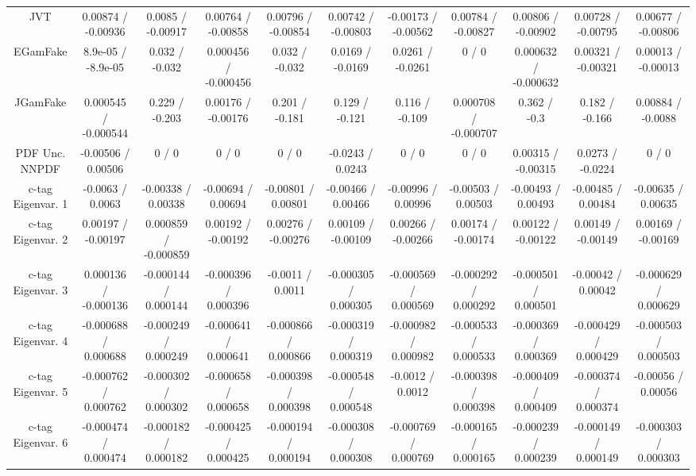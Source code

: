 \begin{table}[htbp]
\begin{center}
\begin{tabular}{|c|c|c|c|c|c|c|c|c|c|c|}
  JVT & 0.00874 / -0.00936 & 0.0085 / -0.00917 & 0.00764 / -0.00858 & 0.00796 / -0.00854 & 0.00742 / -0.00803 & -0.00173 / -0.00562 & 0.00784 / -0.00827 & 0.00806 / -0.00902 & 0.00728 / -0.00795 & 0.00677 / -0.00806 \\ 
  EGamFake & 8.9e-05 / -8.9e-05 & 0.032 / -0.032 & 0.000456 / -0.000456 & 0.032 / -0.032 & 0.0169 / -0.0169 & 0.0261 / -0.0261 & 0 / 0 & 0.000632 / -0.000632 & 0.00321 / -0.00321 & 0.00013 / -0.00013 \\ 
  JGamFake & 0.000545 / -0.000544 & 0.229 / -0.203 & 0.00176 / -0.00176 & 0.201 / -0.181 & 0.129 / -0.121 & 0.116 / -0.109 & 0.000708 / -0.000707 & 0.362 / -0.3 & 0.182 / -0.166 & 0.00884 / -0.0088 \\ 
  PDF Unc. NNPDF & -0.00506 / 0.00506 & 0 / 0 & 0 / 0 & 0 / 0 & -0.0243 / 0.0243 & 0 / 0 & 0 / 0 & 0.00315 / -0.00315 & 0.0273 / -0.0224 & 0 / 0 \\ 
  c-tag Eigenvar. 1 & -0.0063 / 0.0063 & -0.00338 / 0.00338 & -0.00694 / 0.00694 & -0.00801 / 0.00801 & -0.00466 / 0.00466 & -0.00996 / 0.00996 & -0.00503 / 0.00503 & -0.00493 / 0.00493 & -0.00485 / 0.00484 & -0.00635 / 0.00635 \\ 
  c-tag Eigenvar. 2 & 0.00197 / -0.00197 & 0.000859 / -0.000859 & 0.00192 / -0.00192 & 0.00276 / -0.00276 & 0.00109 / -0.00109 & 0.00266 / -0.00266 & 0.00174 / -0.00174 & 0.00122 / -0.00122 & 0.00149 / -0.00149 & 0.00169 / -0.00169 \\ 
  c-tag Eigenvar. 3 & 0.000136 / -0.000136 & -0.000144 / 0.000144 & -0.000396 / 0.000396 & -0.0011 / 0.0011 & -0.000305 / 0.000305 & -0.000569 / 0.000569 & -0.000292 / 0.000292 & -0.000501 / 0.000501 & -0.00042 / 0.00042 & -0.000629 / 0.000629 \\ 
  c-tag Eigenvar. 4 & -0.000688 / 0.000688 & -0.000249 / 0.000249 & -0.000641 / 0.000641 & -0.000866 / 0.000866 & -0.000319 / 0.000319 & -0.000982 / 0.000982 & -0.000533 / 0.000533 & -0.000369 / 0.000369 & -0.000429 / 0.000429 & -0.000503 / 0.000503 \\ 
  c-tag Eigenvar. 5 & -0.000762 / 0.000762 & -0.000302 / 0.000302 & -0.000658 / 0.000658 & -0.000398 / 0.000398 & -0.000548 / 0.000548 & -0.0012 / 0.0012 & -0.000398 / 0.000398 & -0.000409 / 0.000409 & -0.000374 / 0.000374 & -0.00056 / 0.00056 \\ 
  c-tag Eigenvar. 6 & -0.000474 / 0.000474 & -0.000182 / 0.000182 & -0.000425 / 0.000425 & -0.000194 / 0.000194 & -0.000308 / 0.000308 & -0.000769 / 0.000769 & -0.000165 / 0.000165 & -0.000239 / 0.000239 & -0.000149 / 0.000149 & -0.000303 / 0.000303 \\ 

\end{tabular}
\end{center}
\end{table}
